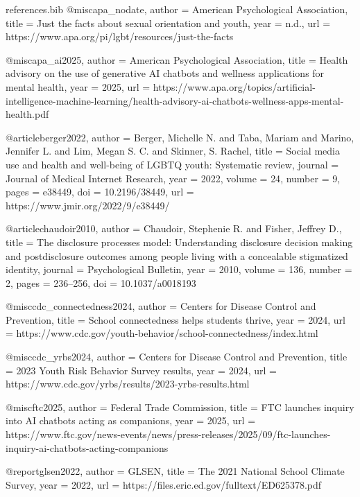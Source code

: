 \begin{filecontents*}{references.bib}
@misc{apa_nodate,
  author = {{American Psychological Association}},
  title = {Just the facts about sexual orientation and youth},
  year = {n.d.},
  url = {https://www.apa.org/pi/lgbt/resources/just-the-facts}
}

@misc{apa_ai2025,
  author = {{American Psychological Association}},
  title = {Health advisory on the use of generative {AI} chatbots and wellness applications for mental health},
  year = {2025},
  url = {https://www.apa.org/topics/artificial-intelligence-machine-learning/health-advisory-ai-chatbots-wellness-apps-mental-health.pdf}
}

@article{berger2022,
  author = {Berger, Michelle N. and Taba, Mariam and Marino, Jennifer L. and Lim, Megan S. C. and Skinner, S. Rachel},
  title = {Social media use and health and well-being of {LGBTQ} youth: Systematic review},
  journal = {Journal of Medical Internet Research},
  year = {2022},
  volume = {24},
  number = {9},
  pages = {e38449},
  doi = {10.2196/38449},
  url = {https://www.jmir.org/2022/9/e38449/}
}

@article{chaudoir2010,
  author = {Chaudoir, Stephenie R. and Fisher, Jeffrey D.},
  title = {The disclosure processes model: Understanding disclosure decision making and postdisclosure outcomes among people living with a concealable stigmatized identity},
  journal = {Psychological Bulletin},
  year = {2010},
  volume = {136},
  number = {2},
  pages = {236--256},
  doi = {10.1037/a0018193}
}

@misc{cdc_connectedness2024,
  author = {{Centers for Disease Control and Prevention}},
  title = {School connectedness helps students thrive},
  year = {2024},
  url = {https://www.cdc.gov/youth-behavior/school-connectedness/index.html}
}

@misc{cdc_yrbs2024,
  author = {{Centers for Disease Control and Prevention}},
  title = {2023 {Youth Risk Behavior Survey} results},
  year = {2024},
  url = {https://www.cdc.gov/yrbs/results/2023-yrbs-results.html}
}

@misc{ftc2025,
  author = {{Federal Trade Commission}},
  title = {{FTC} launches inquiry into {AI} chatbots acting as companions},
  year = {2025},
  url = {https://www.ftc.gov/news-events/news/press-releases/2025/09/ftc-launches-inquiry-ai-chatbots-acting-companions}
}

@report{glsen2022,
  author = {{GLSEN}},
  title = {The 2021 {National School Climate Survey}},
  year = {2022},
  url = {https://files.eric.ed.gov/fulltext/ED625378.pdf}
}


\end{filecontents*}
